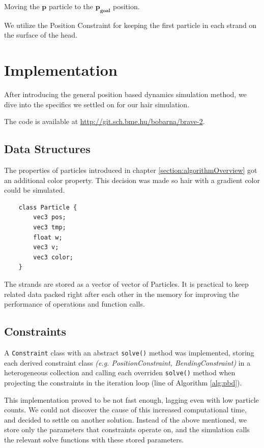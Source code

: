 \documentclass[sigplan,screen,nonacm]{acmart}
\renewcommand{\b}{\boldsymbol}
\begin{document}
Moving the $\b{p}$ particle to the $\b{p_{goal}}$ position.

We utilize the Position Constraint for keeping the first particle in each strand
on the surface of the head.


\section{Implementation}
After introducing the general position based dynamics simulation method, we dive
into the specifics we settled on for our hair simulation.

The code is available at \url{http://git.sch.bme.hu/bobarna/brave-2}.

\subsection{Data Structures}

The properties of particles introduced in chapter
\ref{section:algorithmOverview}  got an
additional color property. This decision was made so hair with a gradient color
could be simulated.

\begin{verbatim}
    class Particle {
        vec3 pos;
        vec3 tmp;
        float w;
        vec3 v;
        vec3 color;
    }
\end{verbatim}

The strands are stored as a vector of vector of Particles. It is practical to
keep related data packed right after each other in the memory for improving the
performance of operations and function calls.


\subsection{Constraints}
A \texttt{Constraint} class with an abstract \texttt{solve()} method was
implemented, storing each derived constraint class \emph{(e.g.
PositionConstraint, BendingConstraint)} in a heterogeneous
collection and calling each overriden \texttt{solve()} method when projecting
the constraints in the iteration loop (line  of Algorithm
\ref{alg:pbd}).

This implementation proved to be not fast enough, lagging even with low particle
counts. We could not discover the cause of this increased computational time, and
decided to settle on another solution. Instead of the above mentioned, we
store only the parameters that constraints operate on, and the simulation calls
the relevant solve functions with these stored parameters.
\end{document}
